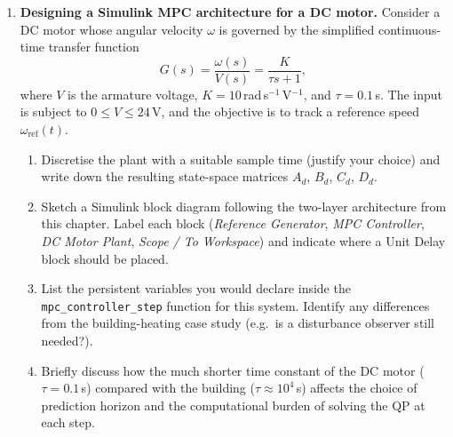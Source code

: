 \begin{enumerate}
	\item \textbf{Designing a Simulink MPC architecture for a DC motor.}
	Consider a DC motor whose angular velocity $\omega$ is governed by the
	simplified continuous-time transfer function
	\[
		G(s) = \frac{\omega(s)}{V(s)} = \frac{K}{\tau s + 1},
	\]
	where $V$ is the armature voltage, $K = 10$\,rad\,s$^{-1}$\,V$^{-1}$,
	and $\tau = 0.1$\,s.  The input is subject to
	$0 \le V \le 24$\,V, and the objective is to track a reference speed
	$\omega_{\mathrm{ref}}(t)$.
	\begin{enumerate}
		\item Discretise the plant with a suitable sample time (justify your
		      choice) and write down the resulting state-space matrices
		      $A_d$, $B_d$, $C_d$, $D_d$.
		\item Sketch a Simulink block diagram following the two-layer
		      architecture from this chapter.  Label each block
		      (\textit{Reference Generator}, \textit{MPC Controller},
		      \textit{DC Motor Plant}, \textit{Scope / To Workspace}) and
		      indicate where a Unit Delay block should be placed.
		\item List the persistent variables you would declare inside the
		      \texttt{mpc\_controller\_step} function for this system.
		      Identify any differences from the building-heating case study
		      (e.g.\ is a disturbance observer still needed?).
		\item Briefly discuss how the much shorter time constant of the DC
		      motor ($\tau = 0.1$\,s) compared with the building
		      ($\tau \approx 10^4$\,s) affects the choice of prediction
		      horizon and the computational burden of solving the QP at each
		      step.
	\end{enumerate}

\end{enumerate}